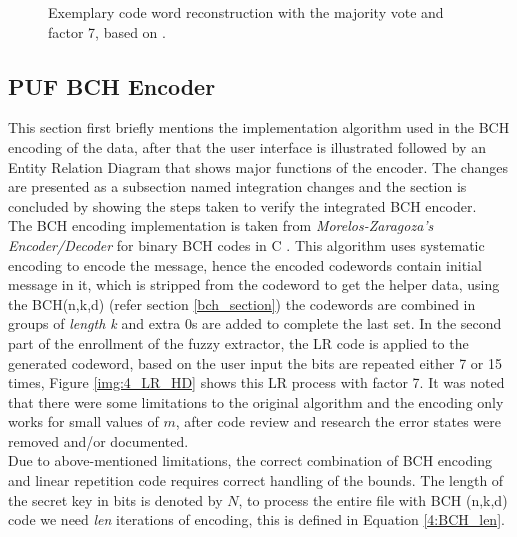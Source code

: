 \begin{figure}[h]
\centering
{}
\caption{Exemplary code word reconstruction with the majority vote and factor 7, based on \cite{10}.}
\label{img:4_MV_codewords}
\end{figure}

\subsection{PUF BCH Encoder}
This section first briefly mentions the implementation algorithm used in the BCH encoding of the data, after that the user interface is illustrated followed by an Entity Relation Diagram that shows major functions of the encoder. The changes are presented as a subsection named integration changes and the section is concluded by showing the steps taken to verify the integrated BCH encoder.\\

The BCH encoding implementation is taken from \emph{Morelos-Zaragoza's Encoder/Decoder} for binary BCH codes in C \cite{69}. This algorithm uses systematic encoding to encode the message, hence the encoded codewords contain initial message in it, which is stripped from the codeword to get the helper data, using the BCH(n,k,d) (refer section \ref{bch_section}) the codewords are combined in groups of \emph{length k} and extra 0s are added to complete the last set. In the
second part of the enrollment of the fuzzy extractor, the LR code is applied to the generated codeword, based on the user input the bits are repeated either 7 or 15 times, Figure \ref{img:4_LR_HD} shows this LR process with factor 7. It was noted that there were some limitations to the original algorithm and the encoding only works for small values of $m$, after code review and research the error states were removed and/or documented.\\

	Due to above-mentioned limitations, the correct combination of BCH encoding and linear repetition code requires correct handling of the bounds. The length of the secret key in bits is denoted by $N$, to process the entire file with BCH (n,k,d) code we need \emph{len} iterations of encoding, this is defined in Equation \ref{4:BCH_len}.

